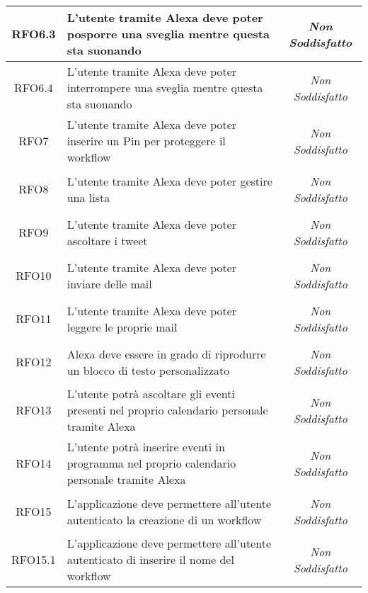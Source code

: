 \begin{longtable}{|c|>{\centering}m{7cm}|c|}
	\hypertarget{RFO6.3}{RFO6.3} & L'utente tramite Alexa deve poter posporre una sveglia mentre questa sta suonando & \textit{Non Soddisfatto}\\ \hline
	
	\hypertarget{RFO6.4}{RFO6.4} & L'utente tramite Alexa deve poter interrompere una sveglia mentre questa sta suonando & \textit{Non Soddisfatto}\\ \hline
	
	\hypertarget{RFO7}{RFO7} & L'utente tramite Alexa deve poter inserire un Pin per proteggere il workflow & \textit{Non Soddisfatto}\\ \hline
	
	\hypertarget{RFO8}{RFO8} & L'utente tramite Alexa deve poter gestire una lista & \textit{Non Soddisfatto}\\ \hline
	
	\hypertarget{RFO9}{RFO9} & L'utente tramite Alexa deve poter ascoltare i tweet & \textit{Non Soddisfatto}\\ \hline
	
	\hypertarget{RFO10}{RFO10} & L'utente tramite Alexa deve poter inviare delle mail & \textit{Non Soddisfatto}\\ \hline
	
	\hypertarget{RFO11}{RFO11} & L'utente tramite Alexa deve poter leggere le proprie mail & \textit{Non Soddisfatto}\\ \hline
	
	\hypertarget{RFO12}{RFO12} & Alexa deve essere in grado di riprodurre un blocco di testo personalizzato & \textit{Non Soddisfatto}\\ \hline
	
	\hypertarget{RFO13}{RFO13} & L'utente potrà ascoltare gli eventi presenti nel proprio calendario personale tramite Alexa & \textit{Non Soddisfatto}\\ \hline
	
	\hypertarget{RFO14}{RFO14} & L'utente potrà inserire eventi in programma nel proprio calendario personale tramite Alexa & \textit{Non Soddisfatto}\\ \hline
	
	\hypertarget{RFO15}{RFO15} & L'applicazione deve permettere all'utente autenticato la creazione di un workflow & \textit{Non Soddisfatto}\\ \hline
	
	\hypertarget{RFO15.1}{RFO15.1} & L'applicazione deve permettere all'utente autenticato di inserire il nome del workflow & \textit{Non Soddisfatto}\\ \hline
	

\end{longtable}
